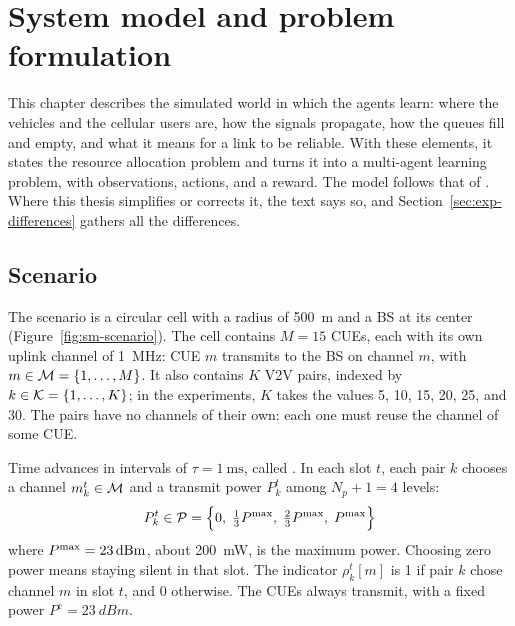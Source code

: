 \chapter{System model and problem formulation}
\label{chap:system-model}

This chapter describes the simulated world in which the agents learn: where the vehicles and the cellular
users are, how the signals propagate, how the queues fill and empty, and what it means for a link to be
reliable. With these elements, it states the resource allocation problem and turns it into a multi-agent
learning problem, with observations, actions, and a reward. The model follows that of
\citet{li+22fedmarl}. Where this thesis simplifies or corrects it, the text says so, and
Section~\ref{sec:exp-differences} gathers all the differences.

\section{Scenario}
\label{sec:sm-scenario}

The scenario is a circular cell with a radius of \SI{500}{\meter} and a \ac{BS} at its center
(Figure~\ref{fig:sm-scenario}). The cell contains $M = 15$ \acp{CUE}, each with its own uplink channel of
\SI{1}{\mega\hertz}: \ac{CUE} $m$ transmits to the \ac{BS} on channel $m$, with
$m \in \mathcal{M} = \{1, \dots, M\}$. It also contains $K$ \ac{V2V} pairs, indexed by
$k \in \mathcal{K} = \{1, \dots, K\}$; in the experiments, $K$ takes the values 5, 10, 15, 20, 25, and 30. The
pairs have no channels of their own: each one must reuse the channel of some \ac{CUE}.

Time advances in intervals of $\tau = \SI{1}{\milli\second}$, called . In each slot $t$, each
pair $k$ chooses a channel $m_k^t \in \mathcal{M}$ and a transmit power $P_k^t$ among $N_p + 1 = 4$ levels:
\begin{equation}
  P_k^t \in \mathcal{P} = \Bigl\{ 0,\; \tfrac{1}{3}P^{\mathrm{max}},\; \tfrac{2}{3}P^{\mathrm{max}},\; P^{\mathrm{max}} \Bigr\}
  \label{eq:sm-power-levels}
\end{equation}
where $P^{\mathrm{max}} = \SI{23}{dBm}$, about \SI{200}{\milli\watt}, is the maximum power. Choosing zero power means
staying silent in that slot. The indicator $\rho_k^t[m]$ is 1 if pair $k$ chose channel $m$ in slot $t$, and
0 otherwise. The \acp{CUE} always transmit, with a fixed power $P^{\mathrm{c}} = \SI{23}{dBm}$.

